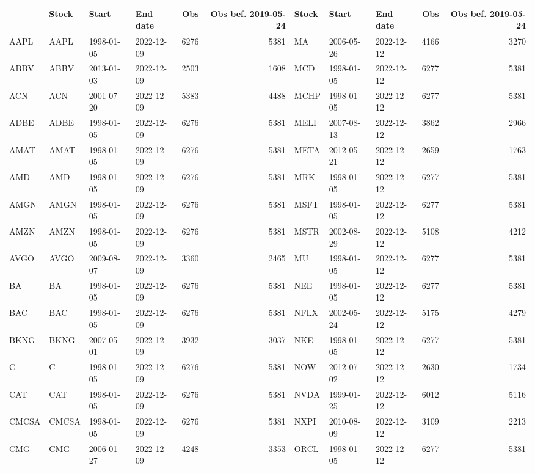\begin{table}[ht]
\centering
\begin{tabular}{llllrrlllrr}
  \hline
 & Stock & Start & End date & Obs & Obs bef. 2019-05-24 & Stock & Start & End date & Obs & Obs bef. 2019-05-24 \\ 
  \hline
AAPL & AAPL & 1998-01-05 & 2022-12-09 & 6276 & 5381 & MA & 2006-05-26 & 2022-12-12 & 4166 & 3270 \\ 
  ABBV & ABBV & 2013-01-03 & 2022-12-09 & 2503 & 1608 & MCD & 1998-01-05 & 2022-12-12 & 6277 & 5381 \\ 
  ACN & ACN & 2001-07-20 & 2022-12-09 & 5383 & 4488 & MCHP & 1998-01-05 & 2022-12-12 & 6277 & 5381 \\ 
  ADBE & ADBE & 1998-01-05 & 2022-12-09 & 6276 & 5381 & MELI & 2007-08-13 & 2022-12-12 & 3862 & 2966 \\ 
  AMAT & AMAT & 1998-01-05 & 2022-12-09 & 6276 & 5381 & META & 2012-05-21 & 2022-12-12 & 2659 & 1763 \\ 
  AMD & AMD & 1998-01-05 & 2022-12-09 & 6276 & 5381 & MRK & 1998-01-05 & 2022-12-12 & 6277 & 5381 \\ 
  AMGN & AMGN & 1998-01-05 & 2022-12-09 & 6276 & 5381 & MSFT & 1998-01-05 & 2022-12-12 & 6277 & 5381 \\ 
  AMZN & AMZN & 1998-01-05 & 2022-12-09 & 6276 & 5381 & MSTR & 2002-08-29 & 2022-12-12 & 5108 & 4212 \\ 
  AVGO & AVGO & 2009-08-07 & 2022-12-09 & 3360 & 2465 & MU & 1998-01-05 & 2022-12-12 & 6277 & 5381 \\ 
  BA & BA & 1998-01-05 & 2022-12-09 & 6276 & 5381 & NEE & 1998-01-05 & 2022-12-12 & 6277 & 5381 \\ 
  BAC & BAC & 1998-01-05 & 2022-12-09 & 6276 & 5381 & NFLX & 2002-05-24 & 2022-12-12 & 5175 & 4279 \\ 
  BKNG & BKNG & 2007-05-01 & 2022-12-09 & 3932 & 3037 & NKE & 1998-01-05 & 2022-12-12 & 6277 & 5381 \\ 
  C & C & 1998-01-05 & 2022-12-09 & 6276 & 5381 & NOW & 2012-07-02 & 2022-12-12 & 2630 & 1734 \\ 
  CAT & CAT & 1998-01-05 & 2022-12-09 & 6276 & 5381 & NVDA & 1999-01-25 & 2022-12-12 & 6012 & 5116 \\ 
  CMCSA & CMCSA & 1998-01-05 & 2022-12-09 & 6276 & 5381 & NXPI & 2010-08-09 & 2022-12-12 & 3109 & 2213 \\ 
  CMG & CMG & 2006-01-27 & 2022-12-09 & 4248 & 3353 & ORCL & 1998-01-05 & 2022-12-12 & 6277 & 5381 \\ 

\end{tabular}
\end{table}
